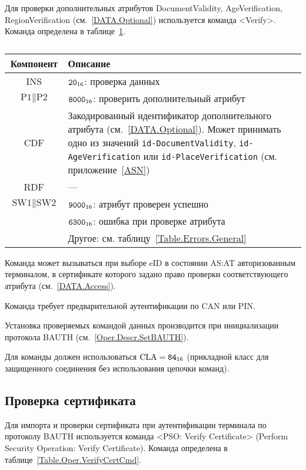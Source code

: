 Для проверки дополнительных атрибутов DocumentValidity, AgeVerification, 
RegionVerification (см.~\ref{DATA.Optional}) используется команда  <Verify>. 
Команда определена в таблице~\ref{Table.Oper.VerifyDataCmd}.

\begin{table}[hbt]
\caption{}\label{Table.Oper.VerifyDataCmd}
\begin{tabular}{|c|p{14cm}|}
\hline
Компонент & Описание \\
\hline
\hline
INS & $\texttt{20}_{16}$: проверка данных\\
\hline
$\text{P1} \parallel \text{P2}$ & $\texttt{8000}_{16}$: 
проверить дополнительный атрибут\\
\hline
CDF & Закодированный идентификатор дополнительного атрибута 
(см.~\ref{DATA.Optional}). 
Может принимать одно из значений 
\verb|id-DocumentValidity|, \verb|id-AgeVerification| или \verb|id-PlaceVerification| 
(см. приложение~\ref{ASN})\\
\hline 
\hline
RDF &  --- \\
\hline
$\text{SW1} \parallel \text{SW2}$ & $\texttt{9000}_{16}$: атрибут проверен успешно\\
\cline{2-2}
 & $\texttt{6300}_{16}$: ошибка при проверке атрибута\\
\cline{2-2}
 & Другое: см. таблицу~\ref{Table.Errors.General} \\
\hline
\end{tabular}
\end{table}

Команда может вызываться при выборе eID в состоянии AS:AT
авторизованным терминалом, в сертификате которого задано право
проверки соответствующего атрибута (см.~\ref{DATA.Access}).  

Команда требует предварительной аутентификации по CAN или PIN.

Установка проверяемых командой данных производится 
при инициализации протокола BAUTH (см.~\ref{Oper.Descr.SetBAUTH}).  

Для команды должен использоваться $\text{CLA}=\texttt{84}_{16}$ 
(прикладной класс для защищенного соединения без использования цепочки 
команд). 


\subsection{Проверка сертификата}
\label{Oper.Descr.VerifyCert}

Для импорта и проверки сертификата при аутентификации терминала 
по протоколу BAUTH используется команда 
<PSO: Verify Certificate> (Perform Security Operation: Verify Certificate).
%
Команда определена в таблице~\ref{Table.Oper.VerifyCertCmd}.

